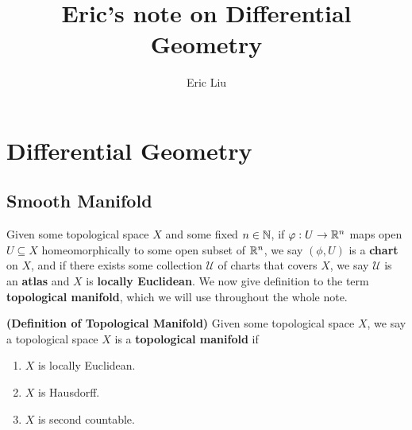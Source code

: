 \documentclass{report}
\title{Eric's note on Differential Geometry}
\author{Eric Liu}
\date{}
\begin{document}
\maketitle
\newpage%

\tableofcontents
\pagebreak
\chapter{Differential Geometry}
\label{Differentail Geometry}
\section{Smooth Manifold}
\begin{mdframed}
Given some topological space $X$ and some fixed $n\in\mathbb{N}$, if $\varphi:U\rightarrow \mathbb{R}^n$ maps open $U\subseteq X$ homeomorphically to some open subset of $\mathbb{R}^n$, we say  $(\phi,U)$ is a \textbf{chart} on $X$, and if there exists some collection $\mathcal{U}$ of charts that covers $X$, we say $\mathcal{U}$ is an  \textbf{atlas} and $X$ is  \textbf{locally Euclidean}.  We now give definition to the term \textbf{topological manifold}, which we will use throughout the whole note.  
\end{mdframed}
\begin{definition}
\textbf{(Definition of Topological Manifold)} Given some topological space $X$, we say a topological space $X$ is a \textbf{topological manifold} if 
\begin{enumerate}[label=(\alph*)]
  \item $X$ is locally Euclidean. 
  \item $X$ is Hausdorff. 
  \item $X$ is second countable.
\end{enumerate}
\end{definition}
\end{document}
